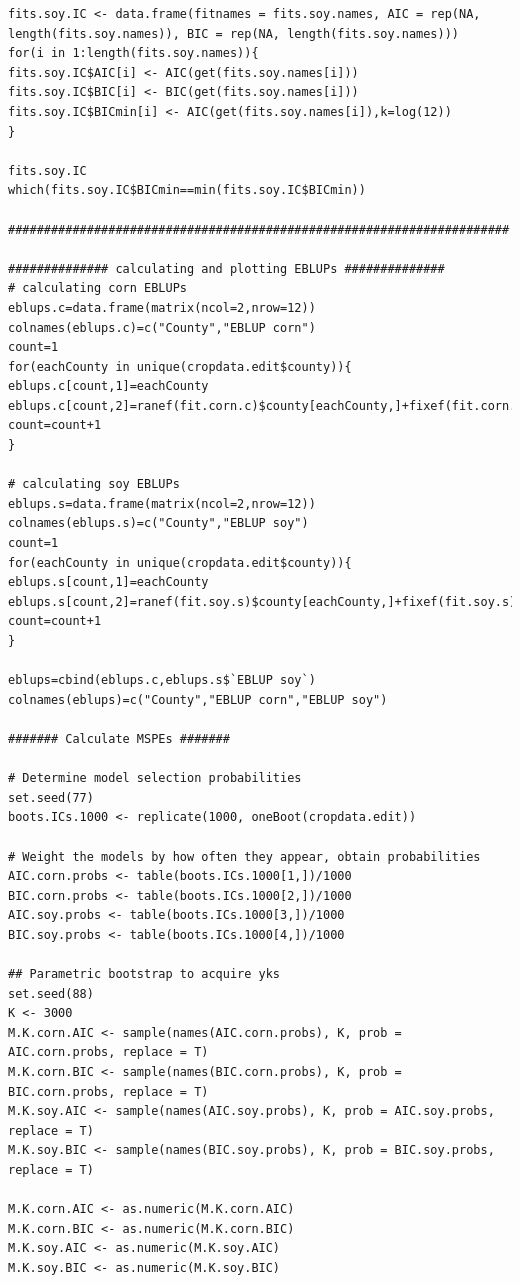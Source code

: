 \documentclass{article}
\begin{document}
\begin{Verbatim}[fontsize=\tiny]
fits.soy.IC <- data.frame(fitnames = fits.soy.names, AIC = rep(NA, length(fits.soy.names)), BIC = rep(NA, length(fits.soy.names)))
for(i in 1:length(fits.soy.names)){
fits.soy.IC$AIC[i] <- AIC(get(fits.soy.names[i]))
fits.soy.IC$BIC[i] <- BIC(get(fits.soy.names[i]))
fits.soy.IC$BICmin[i] <- AIC(get(fits.soy.names[i]),k=log(12))
}

fits.soy.IC
which(fits.soy.IC$BICmin==min(fits.soy.IC$BICmin))

######################################################################

############## calculating and plotting EBLUPs ##############
# calculating corn EBLUPs
eblups.c=data.frame(matrix(ncol=2,nrow=12))
colnames(eblups.c)=c("County","EBLUP corn")
count=1
for(eachCounty in unique(cropdata.edit$county)){
eblups.c[count,1]=eachCounty
eblups.c[count,2]=ranef(fit.corn.c)$county[eachCounty,]+fixef(fit.corn.c)%*%c(1,cropdata.edit[min(which(cropdata.edit$county==eachCounty)),"meanpixels.corn"])
count=count+1
}

# calculating soy EBLUPs
eblups.s=data.frame(matrix(ncol=2,nrow=12))
colnames(eblups.s)=c("County","EBLUP soy")
count=1
for(eachCounty in unique(cropdata.edit$county)){
eblups.s[count,1]=eachCounty
eblups.s[count,2]=ranef(fit.soy.s)$county[eachCounty,]+fixef(fit.soy.s)%*%c(1,cropdata.edit[min(which(cropdata.edit$county==eachCounty)),"meanpixels.soy"])
count=count+1
}

eblups=cbind(eblups.c,eblups.s$`EBLUP soy`)
colnames(eblups)=c("County","EBLUP corn","EBLUP soy")

####### Calculate MSPEs #######

# Determine model selection probabilities
set.seed(77)
boots.ICs.1000 <- replicate(1000, oneBoot(cropdata.edit))

# Weight the models by how often they appear, obtain probabilities
AIC.corn.probs <- table(boots.ICs.1000[1,])/1000
BIC.corn.probs <- table(boots.ICs.1000[2,])/1000
AIC.soy.probs <- table(boots.ICs.1000[3,])/1000
BIC.soy.probs <- table(boots.ICs.1000[4,])/1000

## Parametric bootstrap to acquire yks
set.seed(88)
K <- 3000
M.K.corn.AIC <- sample(names(AIC.corn.probs), K, prob = AIC.corn.probs, replace = T)
M.K.corn.BIC <- sample(names(BIC.corn.probs), K, prob = BIC.corn.probs, replace = T)
M.K.soy.AIC <- sample(names(AIC.soy.probs), K, prob = AIC.soy.probs, replace = T)
M.K.soy.BIC <- sample(names(BIC.soy.probs), K, prob = BIC.soy.probs, replace = T)

M.K.corn.AIC <- as.numeric(M.K.corn.AIC)
M.K.corn.BIC <- as.numeric(M.K.corn.BIC)
M.K.soy.AIC <- as.numeric(M.K.soy.AIC)
M.K.soy.BIC <- as.numeric(M.K.soy.BIC)


\end{Verbatim}
\end{document}
